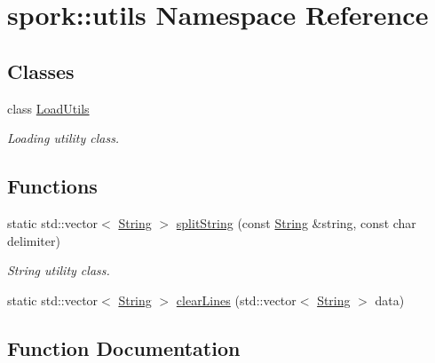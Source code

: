 \hypertarget{namespacespork_1_1utils}{}\section{spork\+:\+:utils Namespace Reference}
\label{namespacespork_1_1utils}
\subsection*{Classes}
\begin{DoxyCompactItemize}
\item 
class \hyperlink{classspork_1_1utils_1_1_load_utils}{Load\+Utils}
\begin{DoxyCompactList}\small\item\em Loading utility class. \end{DoxyCompactList}\end{DoxyCompactItemize}
\subsection*{Functions}
\begin{DoxyCompactItemize}
\item 
static std\+::vector$<$ \hyperlink{my_string_8h_afbeda3fd1bdc8c37d01bdf9f5c8274ff}{String} $>$ \hyperlink{namespacespork_1_1utils_ad8d874fadc25e1542d3559f87fe22b69}{split\+String} (const \hyperlink{my_string_8h_afbeda3fd1bdc8c37d01bdf9f5c8274ff}{String} \&string, const char delimiter)
\begin{DoxyCompactList}\small\item\em String utility class. \end{DoxyCompactList}\item 
static std\+::vector$<$ \hyperlink{my_string_8h_afbeda3fd1bdc8c37d01bdf9f5c8274ff}{String} $>$ \hyperlink{namespacespork_1_1utils_a27fa3e51dde90071d8a4e8910a423459}{clear\+Lines} (std\+::vector$<$ \hyperlink{my_string_8h_afbeda3fd1bdc8c37d01bdf9f5c8274ff}{String} $>$ data)
\end{DoxyCompactItemize}


\subsection{Function Documentation}
\mbox{\label{namespacespork_1_1utils_a27fa3e51dde90071d8a4e8910a423459}} 
